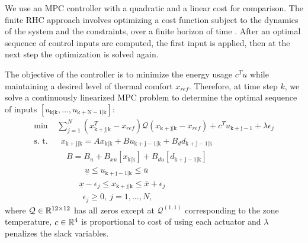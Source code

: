 We use an MPC controller with a quadratic and a linear cost for comparison.
The finite RHC approach involves optimizing a cost function subject to the dynamics of the system and the constraints, over a finite horizon of time \cite{Mayne2000}. After an optimal sequence of control inputs are computed, the first input is applied, then at the next step the optimization is solved again.


The objective of the controller is to minimize the energy usage $c^Tu$ while maintaining a desired level of thermal comfort $x_{ref}$.
Therefore, at time step $k$, we solve a continuously linearized MPC problem to determine the optimal sequence of inputs $[u_{\mathrm{k|k}},\dots,u_{\mathrm{k+N-1|k}}]$:
\begin{subequations}
\begin{align}
\text{min } & \sum_{j=1}^{N} ({x}^T_{\mathrm{k+j|k}} - x_{ref}) \mathcal{Q} ({x}_{\mathrm{k+j|k}} - x_{ref}) + c^Tu_{\mathrm{k+j-1}} +  \lambda\epsilon_j\\
\text{s.~t. } & \ \ x_{\mathrm{k+j|k}} =  Ax_{\mathrm{k|k}} + B u_{\mathrm{k+j-1|k}} + B_d d_{\mathrm{k+j-1|k}} \label{SE:mpc1} \\
& \ \ \ \ \ B = B_u + B_{xu}[x_{\mathrm{k|k}}] + B_{du}[d_{\mathrm{k+j-1|k}}] \label{SE:mpc2}\\
& \ \ \ \ \ \ \ \ \ \ \ \ \ \ \ \underline{u} \leq u_{\mathrm{k+j-1|k}} \leq \bar{u}\\ 
& \ \ \ \ \ \ \ \ \ \ \ \ \underline{x}-\epsilon_j \leq x_{\mathrm{k+j|k}} \leq \bar{x} + \epsilon_j\\\
& \ \ \ \ \ \ \ \ \ \ \ \ \ \ \epsilon_j \geq 0, \ j = 1,\dots,N,
\end{align}\label{E:mpc}
\end{subequations} 
\noindent where $\mathcal{Q} \in \mathbb{R}^{12 \times 12}$ has all zeros except at $\mathcal{Q}^{(1,1)}$ corresponding to the zone temperature, $c \in \mathbb{R}^{4}$ is proportional to cost of using each actuator and $\lambda$ penalizes the slack variables.